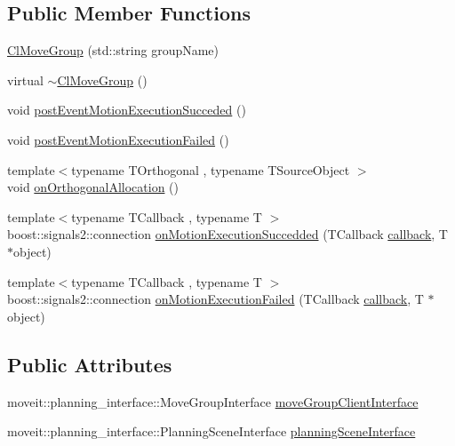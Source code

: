 \subsection*{Public Member Functions}
\begin{DoxyCompactItemize}
\item 
\hyperlink{classcl__move__group__interface_1_1ClMoveGroup_aca9d17734784c5f0ddda33830e630105}{Cl\+Move\+Group} (std\+::string group\+Name)
\item 
virtual \hyperlink{classcl__move__group__interface_1_1ClMoveGroup_afd386921ab8e048fed4cc87fc7407331}{$\sim$\+Cl\+Move\+Group} ()
\item 
void \hyperlink{classcl__move__group__interface_1_1ClMoveGroup_aebaf269db373d41837bae87651458e54}{post\+Event\+Motion\+Execution\+Succeded} ()
\item 
void \hyperlink{classcl__move__group__interface_1_1ClMoveGroup_a39dc3871d29b2af1ab739057f6ca6daa}{post\+Event\+Motion\+Execution\+Failed} ()
\item 
{\footnotesize template$<$typename T\+Orthogonal , typename T\+Source\+Object $>$ }\\void \hyperlink{classcl__move__group__interface_1_1ClMoveGroup_a25e248c5a6aaebf543da08eefeca18f0}{on\+Orthogonal\+Allocation} ()
\item 
{\footnotesize template$<$typename T\+Callback , typename T $>$ }\\boost\+::signals2\+::connection \hyperlink{classcl__move__group__interface_1_1ClMoveGroup_a6aa372d095e82775a04f41cdcf029cf2}{on\+Motion\+Execution\+Succedded} (T\+Callback \hyperlink{sm__ridgeback__barrel__search__2_2servers_2opencv__perception__node_2opencv__perception__node_8cpp_a050e697bd654facce10ea3f6549669b3}{callback}, T $\ast$object)
\item 
{\footnotesize template$<$typename T\+Callback , typename T $>$ }\\boost\+::signals2\+::connection \hyperlink{classcl__move__group__interface_1_1ClMoveGroup_a6a18da445eb780d3099a94d685143295}{on\+Motion\+Execution\+Failed} (T\+Callback \hyperlink{sm__ridgeback__barrel__search__2_2servers_2opencv__perception__node_2opencv__perception__node_8cpp_a050e697bd654facce10ea3f6549669b3}{callback}, T $\ast$object)
\end{DoxyCompactItemize}
\subsection*{Public Attributes}
\begin{DoxyCompactItemize}
\item 
moveit\+::planning\+\_\+interface\+::\+Move\+Group\+Interface \hyperlink{classcl__move__group__interface_1_1ClMoveGroup_a92922ea689e4e1b7b91512c56629c95b}{move\+Group\+Client\+Interface}
\item 
moveit\+::planning\+\_\+interface\+::\+Planning\+Scene\+Interface \hyperlink{classcl__move__group__interface_1_1ClMoveGroup_a11bfab580f36e2ad32c9b37d6f58f44c}{planning\+Scene\+Interface}
\end{DoxyCompactItemize}
